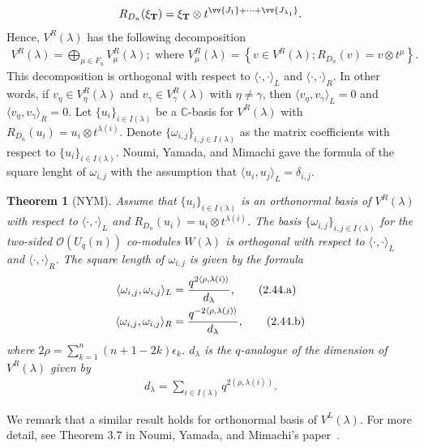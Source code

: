 \documentclass[table,a4paper,reqno]{amsart}
\numberwithin{equation}{section}
\newtheorem{theorem}{Theorem}[section]
\theoremstyle{definition}
\begin{document}
\begin{align}
    R_{D_n}(\xi_{\mathbf{T}})=\xi_{\mathbf{T}}\otimes t^{\vv{J_1}+\cdots+\vv{J_{\lambda_1}}}.\label{eq:2.43}
\end{align}
Hence, $V^R(\lambda)$ has the following decomposition
\begin{align}
    V^R(\lambda)=\bigoplus_{\mu\in F_n}V^R_\mu(\lambda);\text{ where } V^R_\mu(\lambda)=\left\{v\in V^R(\lambda); R_{D_n}(v)=v\otimes t^\mu\right\}.\label{eq:2.44}
\end{align}
This decomposition is orthogonal with respect to $\langle\cdot,\cdot\rangle_L$ and $\langle\cdot,\cdot\rangle_R$. In other words, if $v_\eta\in V^R_\eta(\lambda)$ and $v_\gamma\in V^R_\gamma(\lambda)$ with $\eta\ne\gamma$, then $\langle v_\eta,v_\gamma\rangle_L=0$ and $\langle v_\eta,v_\gamma\rangle_R=0$.
Let $\{u_i\}_{i\in I(\lambda)}$ be a $\mathbb{C}$-basis for $V^R(\lambda)$ with $R_{D_n}(u_i)=u_i\otimes t^{\lambda(i)}$. Denote $\{\omega_{i,j}\}_{i,j\in I(\lambda)}$ as the matrix coefficients with respect to $\{u_i\}_{i\in I(\lambda)}$. Noumi, Yamada, and Mimachi gave the formula of the square lenght of $\omega_{i,j}$ with the assumption that $\langle u_i,u_j\rangle_L=\delta_{i,j}$.
\begin{theorem}[NYM]
    Assume that $\{u_i\}_{i\in I(\lambda)}$ is an orthonormal basis of $V^R(\lambda)$ with respect to $\langle\cdot,\cdot\rangle_L$ and $R_{D_n}(u_i)=u_i\otimes t^{\lambda(i)}$. The basis $\{\omega_{i,j}\}_{i,j\in I(\lambda)}$ for the two-sided $\mathcal{O}(U_q(n))$ co-modules $W(\lambda)$ is orthogonal with respect to $\langle\cdot,\cdot\rangle_L$ and $\langle\cdot,\cdot\rangle_R$. The square length of $\omega_{i,j}$ is given by the formula
    \begin{align}\stepcounter{equation}
        \langle\omega_{i,j},\omega_{i,j}\rangle_L&=\frac{q^{2\langle\rho,\lambda(i)\rangle}}{d_\lambda},\tag{2.44.a}\label{eq:2.45.a}\\
        \langle\omega_{i,j},\omega_{i,j}\rangle_R&=\frac{q^{-2\langle\rho,\lambda(j)\rangle}}{d_\lambda},\tag{2.44.b}\label{eq:2.45.b}
    \end{align}
    where $2\rho=\sum_{k=1}^n(n+1-2k)\epsilon_k$. $d_\lambda$ is the $q$-analogue of the dimension of $V^R(\lambda)$ given by
    \begin{align}
        d_\lambda=\sum_{i\in I(\lambda)}q^{2(\rho,\lambda(i))}.\label{eq:2.46}
    \end{align}
\end{theorem}
We remark that a similar result holds for orthonormal basis of $V^L(\lambda)$. For more detail, see Theorem 3.7 in Noumi, Yamada, and Mimachi's paper~\cite{noumi1993finite}.
\end{document}
